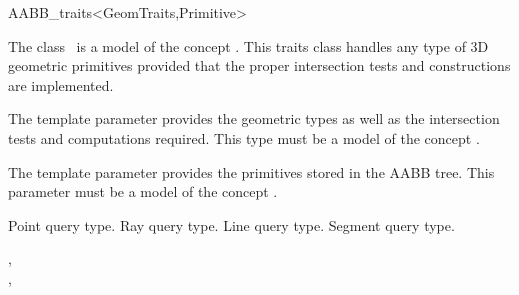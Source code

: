 \ccRefPageBegin


\begin{ccRefClass}{AABB_traits<GeomTraits,Primitive>}


\ccDefinition
  
The class \ccRefName\ is a model of the concept . This traits class handles any type of 3D geometric primitives provided that the proper intersection tests and constructions are implemented.

\ccParameters
The template parameter  provides the geometric types as well as the intersection tests and computations required. This type must be a model of the concept .

The template parameter  provides the primitives stored in the AABB tree. This parameter must be a model of the concept .


\ccTypes

          {Point query type.}
          {Ray query type.}
          {Line query type.}
          {Segment query type.}

\ccCreation
{} 

\ccSeeAlso

,\\
, \\
\\


\end{ccRefClass}

\ccRefPageEnd

